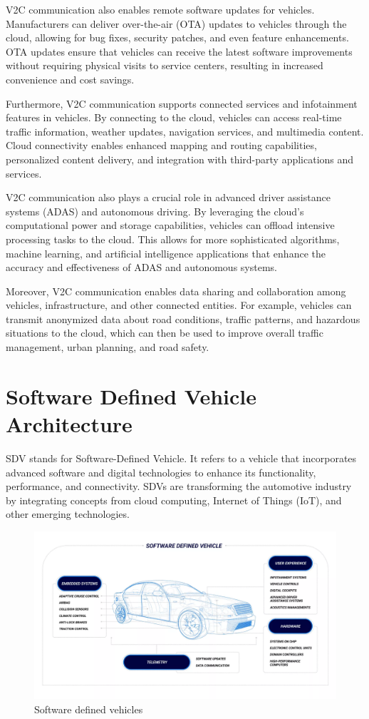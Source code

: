 \documentclass[
12pt,
oneside, 
onehalfspacing, 
nolistspacing, 
parskip, 
chapterinoneline, 
]{AASTCOMPUTER}
\begin{document}
V2C communication also enables remote software updates for vehicles. Manufacturers can deliver over-the-air (OTA) updates to vehicles through the cloud, allowing for bug fixes, security patches, and even feature enhancements. OTA updates ensure that vehicles can receive the latest software improvements without requiring physical visits to service centers, resulting in increased convenience and cost savings.

Furthermore, V2C communication supports connected services and infotainment features in vehicles. By connecting to the cloud, vehicles can access real-time traffic information, weather updates, navigation services, and multimedia content. Cloud connectivity enables enhanced mapping and routing capabilities, personalized content delivery, and integration with third-party applications and services.

V2C communication also plays a crucial role in advanced driver assistance systems (ADAS) and autonomous driving. By leveraging the cloud's computational power and storage capabilities, vehicles can offload intensive processing tasks to the cloud. This allows for more sophisticated algorithms, machine learning, and artificial intelligence applications that enhance the accuracy and effectiveness of ADAS and autonomous systems.

Moreover, V2C communication enables data sharing and collaboration among vehicles, infrastructure, and other connected entities. For example, vehicles can transmit anonymized data about road conditions, traffic patterns, and hazardous situations to the cloud, which can then be used to improve overall traffic management, urban planning, and road safety.


\section{Software Defined Vehicle Architecture}
SDV \cite{liu2022impact} stands for Software-Defined Vehicle. It refers to a vehicle that incorporates advanced software and digital technologies to enhance its functionality, performance, and connectivity. SDVs are transforming the automotive industry by integrating concepts from cloud computing, Internet of Things (IoT), and other emerging technologies.

\begin{figure}[!ht]
	\centering
	\includegraphics[scale=0.32]{Figures/SDV.png}
  	\caption{Software defined vehicles}
  	\label{fig:Software defined vehicles}
\end{figure}
\end{document}
